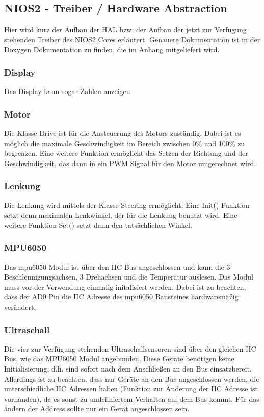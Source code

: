 \subsection{NIOS2 - Treiber / Hardware Abstraction}
Hier wird kurz der Aufbau der HAL bzw. der Aufbau der jetzt zur Verfügung stehenden Treiber des NIOS2 Cores erläutert. Genauere Dokumentation ist in der Doxygen Dokumentation zu finden, die im Anhang mitgeliefert wird. 
\subsubsection{Display}
Das Display kann sogar Zahlen anzeigen
\subsubsection{Motor}
Die Klasse Drive ist für die Ansteuerung des Motors zuständig. Dabei ist es möglich die maximale Geschwindigkeit im Bereich zwischen 0\% und 100\% zu begrenzen. Eine weitere Funktion ermöglicht das Setzen der Richtung und der Geschwindigkeit, das dann in ein PWM Signal für den Motor umgerechnet wird. 
\subsubsection{Lenkung}
Die Lenkung wird mittels der Klasse Steering ermöglicht. Eine Init() Funktion setzt denn maximalen Lenkwinkel, der für die Lenkung benutzt wird. Eine weitere Funktion Set() setzt dann den tatsächlichen Winkel.
\subsubsection{MPU6050}
Das mpu6050 Modul ist über den IIC Bus angeschlossen und kann die 3 Beschleunigungsachsen, 3 Drehachsen und die Temperatur auslesen. Das Modul muss vor der Verwendung einmalig initalisiert werden. Dabei ist zu beachten, dass der AD0 Pin die IIC Adresse des mpu6050 Bausteines hardwaremäßig verändert. 
\subsubsection{Ultraschall}
Die vier zur Verfügung stehenden Ultraschallsensoren sind über den gleichen IIC Bus, wie das MPU6050 Modul angebunden. Diese Geräte benötigen keine Initialisierung, d.h. sind sofort nach dem Anschließen an den Bus einsatzbereit. Allerdings ist zu beachten, dass nur Geräte an den Bus angeschlossen werden, die unterschiedliche IIC Adressen haben (Funktion zur Änderung der IIC Adresse ist vorhanden), da es sonst zu undefiniertem Verhalten auf dem Bus kommt. Für das ändern der Address sollte nur ein Gerät angeschlossen sein.

